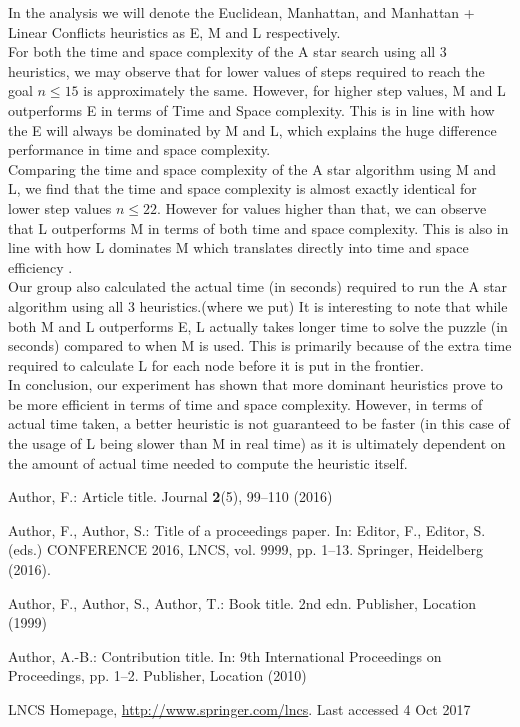 \documentclass[runningheads]{llncs}
\begin{document}
In the analysis we will denote the Euclidean, Manhattan, and Manhattan + Linear Conflicts heuristics as E, M and L respectively. \\ 
For both the time and space complexity of the A star search using all 3 heuristics, we may observe that for lower values of steps required to reach the goal \( n \leq 15 \) is approximately the same. However, for higher step values, M and L outperforms E in terms of Time and Space complexity. This is in line with how the E will always be dominated by M and L, which explains the huge difference performance in time and space complexity. \\
Comparing the time and space complexity of the A star algorithm using M and L, we find that the time and space complexity is almost exactly identical for lower step values \( n \leq 22 \). However for values higher than that, we can observe that L outperforms M in terms of both time and space complexity. This is also in line with how L dominates M which translates directly into time and space efficiency \cite[p104]{stuart_russell_artifical_2010}. \\
Our group also calculated the actual time (in seconds) required to run the A star algorithm using all 3 heuristics.(where we put) It is interesting to note that while both M and L outperforms E, L actually takes longer time to solve the puzzle (in seconds) compared to when M is used. This is primarily because of the extra time required to calculate L for each node before it is put in the frontier. \\
In conclusion, our experiment has shown that more dominant heuristics prove to be more efficient in terms of time and space complexity. However, in terms of actual time taken, a better heuristic is not guaranteed to be faster (in this case of the usage of L being slower than M in real time) as it is ultimately dependent on the amount of actual time needed to compute the heuristic itself.

%
%
%



\begin{thebibliography}{8}
Author, F.: Article title. Journal \textbf{2}(5), 99--110 (2016)

Author, F., Author, S.: Title of a proceedings paper. In: Editor,
F., Editor, S. (eds.) CONFERENCE 2016, LNCS, vol. 9999, pp. 1--13.
Springer, Heidelberg (2016). 

Author, F., Author, S., Author, T.: Book title. 2nd edn. Publisher,
Location (1999)

Author, A.-B.: Contribution title. In: 9th International Proceedings
on Proceedings, pp. 1--2. Publisher, Location (2010)

LNCS Homepage, \url{http://www.springer.com/lncs}. Last accessed 4
Oct 2017
\end{thebibliography}
\end{document}
